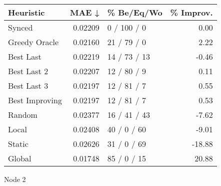 \begin{tabular}{lrlr}
\toprule
\textbf{Heuristic} & \textbf{MAE ↓} & \textbf{\% Be/Eq/Wo} & \textbf{\% Improv.} \\
\midrule
            Synced &        0.02209 &          0 / 100 / 0 &                0.00 \\
     Greedy Oracle &        0.02160 &          21 / 79 / 0 &                2.22 \\
         Best Last &        0.02219 &         14 / 73 / 13 &               -0.46 \\
       Best Last 2 &        0.02207 &          12 / 80 / 9 &                0.11 \\
       Best Last 3 &        0.02197 &          12 / 81 / 7 &                0.55 \\
    Best Improving &        0.02197 &          12 / 81 / 7 &                0.53 \\
            Random &        0.02377 &         16 / 41 / 43 &               -7.62 \\
             Local &        0.02408 &          40 / 0 / 60 &               -9.01 \\
            Static &        0.02626 &          31 / 0 / 69 &              -18.88 \\
            Global &        0.01748 &          85 / 0 / 15 &               20.88 \\
\bottomrule
\end{tabular}
\caption{Node 2}
\label{tab:iid_lr05_le1_bs2_2}
